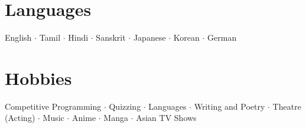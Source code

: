 \documentclass[letterpaper,11pt]{article}
\begin{document}
\section{Languages}
English $\cdot$ Tamil $\cdot$ Hindi $\cdot$ Sanskrit $\cdot$ Japanese $\cdot$ Korean $\cdot$ German

\section{Hobbies}
Competitive Programming $\cdot$ Quizzing $\cdot$ Languages $\cdot$ Writing and Poetry $\cdot$ Theatre (Acting) $\cdot$ Music $\cdot$ Anime $\cdot$ Manga $\cdot$ Asian TV Shows

\end{document}
